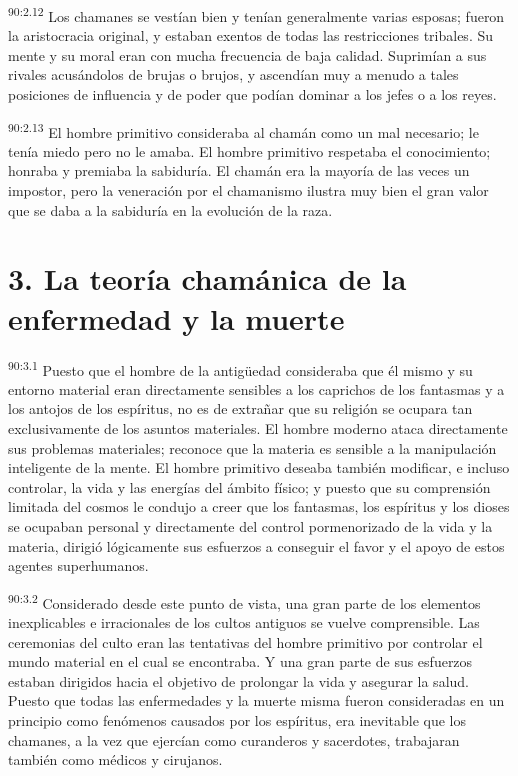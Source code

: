 \par
\textsuperscript{90:2.12} Los chamanes se vestían bien y tenían generalmente varias esposas; fueron la aristocracia original, y estaban exentos de todas las restricciones tribales. Su mente y su moral eran con mucha frecuencia de baja calidad. Suprimían a sus rivales acusándolos de brujas o brujos, y ascendían muy a menudo a tales posiciones de influencia y de poder que podían dominar a los jefes o a los reyes.

\par
\textsuperscript{90:2.13} El hombre primitivo consideraba al chamán como un mal necesario; le tenía miedo pero no le amaba. El hombre primitivo respetaba el conocimiento; honraba y premiaba la sabiduría. El chamán era la mayoría de las veces un impostor, pero la veneración por el chamanismo ilustra muy bien el gran valor que se daba a la sabiduría en la evolución de la raza.

\section*{3. La teoría chamánica de la enfermedad y la muerte}
\par
\textsuperscript{90:3.1} Puesto que el hombre de la antig\"uedad consideraba que él mismo y su entorno material eran directamente sensibles a los caprichos de los fantasmas y a los antojos de los espíritus, no es de extrañar que su religión se ocupara tan exclusivamente de los asuntos materiales. El hombre moderno ataca directamente sus problemas materiales; reconoce que la materia es sensible a la manipulación inteligente de la mente. El hombre primitivo deseaba también modificar, e incluso controlar, la vida y las energías del ámbito físico; y puesto que su comprensión limitada del cosmos le condujo a creer que los fantasmas, los espíritus y los dioses se ocupaban personal y directamente del control pormenorizado de la vida y la materia, dirigió lógicamente sus esfuerzos a conseguir el favor y el apoyo de estos agentes superhumanos.

\par
\textsuperscript{90:3.2} Considerado desde este punto de vista, una gran parte de los elementos inexplicables e irracionales de los cultos antiguos se vuelve comprensible. Las ceremonias del culto eran las tentativas del hombre primitivo por controlar el mundo material en el cual se encontraba. Y una gran parte de sus esfuerzos estaban dirigidos hacia el objetivo de prolongar la vida y asegurar la salud. Puesto que todas las enfermedades y la muerte misma fueron consideradas en un principio como fenómenos causados por los espíritus, era inevitable que los chamanes, a la vez que ejercían como curanderos y sacerdotes, trabajaran también como médicos y cirujanos.

